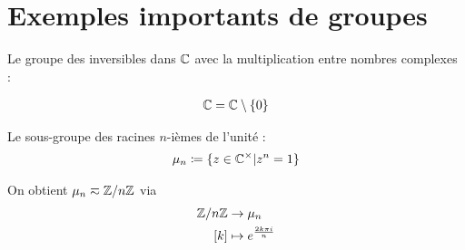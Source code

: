 \documentclass[french,a4paper,10pt]{article}
\begin{document}
	\section{Exemples importants de groupes}
	\begin{example}
		Le groupe des inversibles dans $\mathbb{C}$ avec la multiplication entre nombres complexes :
		
		\[\begin{aligned}
			\mathbb{C}=\mathbb{C} \setminus \{0\}
		\end{aligned}\]
		
		Le sous-groupe des racines $n$-ièmes de l'unité :
		\[\begin{aligned} 
			\mu_n\coloneq\{z\in\mathbb{C}^\times | z^n=1\}
		\end{aligned}\]
		
		\begin{remark}
			On obtient $\mu_n \eqsim \mathbb{Z}/n\mathbb{Z}$ via
			\[\begin{aligned}
				\mathbb{Z}/n\mathbb{Z}&\to \mu_n\\
				[k]&\mapsto e^{\frac{2k\pi i}n}
			\end{aligned}\]
		\end{remark}
		
	\end{example}
\end{document}
